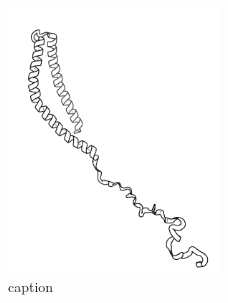 
\begin{figure}[h] %
	\centering
	\includegraphics[width = 0.5\textwidth]{pics/alpha_struct.png}
	\caption{caption}
	\label{fig:plasmid}	
\end{figure}



